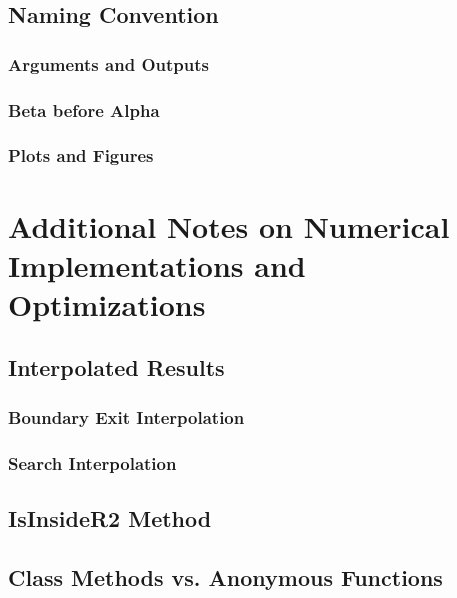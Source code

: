 \documentclass[10pt]{article}
\begin{document}
	\subsection{Naming Convention}
		\subsubsection{Arguments and Outputs}
		\subsubsection{Beta before Alpha}
		\subsubsection{Plots and Figures}


\newpage
\section{Additional Notes on Numerical Implementations and Optimizations}

	\subsection{Interpolated Results}
		
		\subsubsection{Boundary Exit Interpolation}
		\subsubsection{Search Interpolation}
		
			
	\subsection{IsInsideR2 Method}


	\subsection{Class Methods vs. Anonymous Functions}
	

\end{document}
